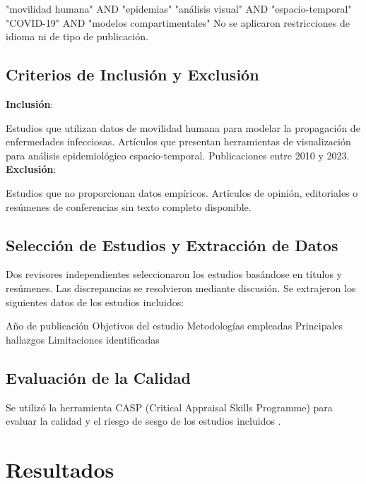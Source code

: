\documentclass[sigconf]{acmart}
\begin{document}
"movilidad humana" AND "epidemias"
"análisis visual" AND "espacio-temporal"
"COVID-19" AND "modelos compartimentales"
No se aplicaron restricciones de idioma ni de tipo de publicación.

\subsection{Criterios de Inclusión y Exclusión}

\textbf{Inclusión}:

Estudios que utilizan datos de movilidad humana para modelar la propagación de enfermedades infecciosas.
Artículos que presentan herramientas de visualización para análisis epidemiológico espacio-temporal.
Publicaciones entre 2010 y 2023.
\textbf{Exclusión}:

Estudios que no proporcionan datos empíricos.
Artículos de opinión, editoriales o resúmenes de conferencias sin texto completo disponible.
\subsection{Selección de Estudios y Extracción de Datos}

Dos revisores independientes seleccionaron los estudios basándose en títulos y resúmenes. Las discrepancias se resolvieron mediante discusión. Se extrajeron los siguientes datos de los estudios incluidos:

Año de publicación
Objetivos del estudio
Metodologías empleadas
Principales hallazgos
Limitaciones identificadas
\subsection{Evaluación de la Calidad}

Se utilizó la herramienta CASP (Critical Appraisal Skills Programme) para evaluar la calidad y el riesgo de sesgo de los estudios incluidos \cite{casp2018}.

\section{Resultados}
\end{document}
